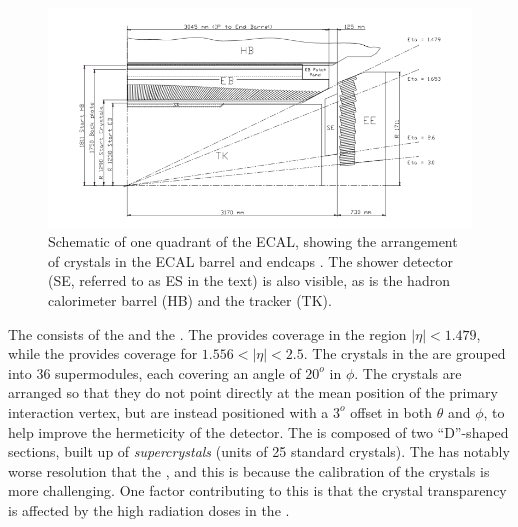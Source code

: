 \begin{figure}[h]
\centering
\includegraphics[width=1.0\textwidth]{detectorFigures/ecalEBEE.png}
\caption{Schematic \crosssection of one quadrant of the ECAL, showing the arrangement of crystals in the ECAL barrel and endcaps \cite{CMSEcalTDR}. The shower detector (SE, referred to as ES in the text) is also visible, as is the hadron calorimeter barrel (HB) and the tracker (TK).}
\label{fig:ecal}
\end{figure}








The \ECAL consists of the \EB and the \EE. The \EB provides coverage in the region $|\eta| < 1.479$, while the \EE provides coverage for $1.556 < |\eta| < 2.5$. The crystals in the \EB are grouped into 36 supermodules, each covering an angle of $20^o$ in $\phi$. The crystals are arranged so that they do not point directly at the mean position of the primary interaction vertex, but are instead positioned with a $3^o$ offset in both $\theta$ and $\phi$, to help improve the hermeticity of the detector. The \EE is composed of two ``D''-shaped sections, built up of \emph{supercrystals} (units of 25 standard crystals). The \EE has notably worse resolution that the \EB, and this is because the calibration of the crystals is more challenging. One factor contributing to this is that the crystal transparency is affected by the high radiation doses in the \EE. %

